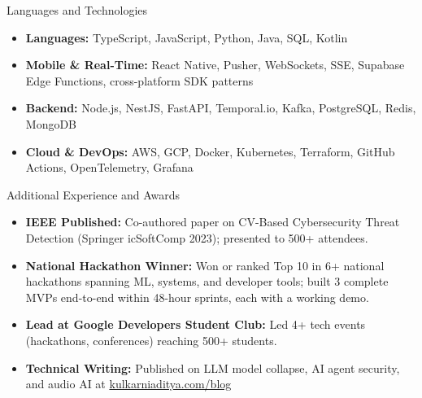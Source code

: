 \documentclass[]{mcdowellcv}
\begin{document}
\begin{cvsection}{Languages and Technologies}
  \begin{cvsubsection}{}{}{}
    \begin{itemize}
      \item \textbf{Languages:} TypeScript, JavaScript, Python, Java, SQL, Kotlin
      \item \textbf{Mobile \& Real-Time:} React Native, Pusher, WebSockets, SSE, Supabase Edge Functions, cross-platform SDK patterns
      \item \textbf{Backend:} Node.js, NestJS, FastAPI, Temporal.io, Kafka, PostgreSQL, Redis, MongoDB
      \item \textbf{Cloud \& DevOps:} AWS, GCP, Docker, Kubernetes, Terraform, GitHub Actions, OpenTelemetry, Grafana
    \end{itemize}
  \end{cvsubsection}
\end{cvsection}

\begin{cvsection}{Additional Experience and Awards}
  \begin{cvsubsection}{}{}{}
    \begin{itemize}
      \item \textbf{IEEE Published:} Co-authored paper on CV-Based Cybersecurity Threat Detection (Springer icSoftComp 2023); presented to 500+ attendees.
      \item \textbf{National Hackathon Winner:} Won or ranked Top 10 in 6+ national hackathons spanning ML, systems, and developer tools; built 3 complete MVPs end-to-end within 48-hour sprints, each with a working demo.
      \item \textbf{Lead at Google Developers Student Club:} Led 4+ tech events (hackathons, conferences) reaching 500+ students.
      \item \textbf{Technical Writing:} Published on LLM model collapse, AI agent security, and audio AI at \href{https://www.kulkarniaditya.com/blog}{kulkarniaditya.com/blog}
    \end{itemize}
  \end{cvsubsection}
\end{cvsection}
\end{document}

